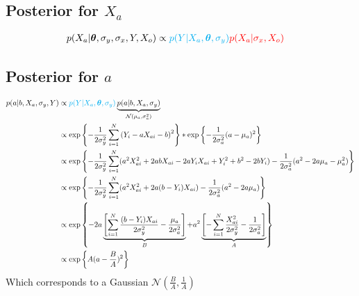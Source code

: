 \documentclass[10pt]{article}
\renewcommand{\vec}[1]{\boldsymbol{#1}}
\begin{document}
    \subsection{Posterior for $X_a$}
    \begin{align}
        p(X_a | \vec{\theta}, \sigma_y, \sigma_x, Y, X_o) &\propto {\color{cyan} p(Y | X_a, \vec{\theta}, \sigma_y)} {\color{red} p(X_a | \sigma_x, X_o)} 
    \end{align}
    
    
    \subsection{Posterior for $a$}
    \begin{align}
        p(a|b, X_a, \sigma_y, Y) &\propto {\color{cyan} p(Y | X_a, \vec{\theta}, \sigma_y)} \underbrace{p(a | b, X_a, \sigma_{y})}_{\mathcal{N}(\mu_a, \sigma_a^2)} \\
        &\propto \exp\left\{ - \frac{1}{2\sigma_y^2} \sum_{i=1}^N \left( Y_i - a X_{ai} - b \right)^2 \right\} * \exp\left\{ - \frac{1}{2\sigma_a^2} ( a - \mu_a )^2 \right\} \\
        &\propto \exp\left\{ - \frac{1}{2\sigma_y^2} \sum_{i=1}^N (a^2 X_{ai}^2  + 2 a b X_{ai} - 2 a Y_i X_{ai} + Y_i^2 + b^2 -2 b Y_i) - \frac{1}{2\sigma_a^2} ( a^2 - 2 a \mu_a - \mu_a^2 ) \right\} \\
        &\propto \exp\left\{ - \frac{1}{2\sigma_y^2} \sum_{i=1}^N (a^2 X_{ai}^2  + 2 a (b - Y_i) X_{ai} ) - \frac{1}{2\sigma_a^2} ( a^2 - 2 a \mu_a ) \right\} \\
        &\propto \exp\left\{ - 2 a \underbrace{\left[ \sum_{i=1}^N \frac{(b - Y_i) X_{ai}}{2\sigma_y^2} - \frac{\mu_a}{2\sigma_a^2} \right]}_{B} + a^2 \underbrace{\left[ - \sum_{i=1}^N \frac{X_{ai}^2}{2\sigma_y^2}  - \frac{1}{2\sigma_a^2} \right]}_{A} \right\} \\
        &\propto \exp\left\{ A (a - \frac{B}{A})^2\right\}
    \end{align}
    Which corresponds to a Gaussian $\mathcal{N}(\frac{B}{A}, \frac{1}{A})$
    
    
\end{document}
